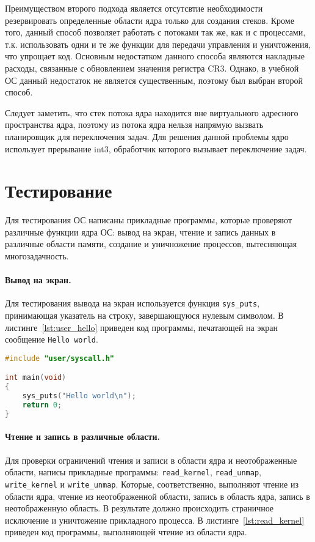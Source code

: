 Преимуществом второго подхода является отсутсвтие необходимости резервировать определенные
области ядра только для создания стеков. Кроме того, данный способ позволяет работать с потоками
так же, как и с процессами, т.к. использовать одни и те же функции для передачи управления и
уничтожения, что упрощает код. Основным недостатком данного способа являются накладные расходы,
связанные с обновлением значения регистра CR3. Однако, в учебной ОС данный недостаток не является
существенным, поэтому был выбран второй способ.

Следует заметить, что стек потока ядра находится вне виртуального адресного пространства ядра,
поэтому из потока ядра нельзя напрямую вызвать планировщик для переключения задач. Для решения данной
проблемы ядро использует прерывание int3, обработчик которого вызывает переключение задач.

\section{Тестирование}
Для тестирования ОС написаны прикладные программы, которые проверяют различные функции ядра ОС:
вывод на экран, чтение и запись данных в различные области памяти, создание и уничножение
процессов, вытесняющая многозадачность.

\paragraph{Вывод на экран.} Для тестирования вывода на экран используется функция \texttt{sys\_puts},
принимающая указатель на строку, завершающуюся нулевым символом. В листинге~\ref{lst:user_hello} приведен
код программы, печатающей на экран сообщение \texttt{Hello world}.

\begin{lstlisting}[language=C, caption={Использование функции \texttt{sys\_puts}}, label={lst:user_hello}]
#include "user/syscall.h"

int main(void)
{
	sys_puts("Hello world\n");
	return 0;
}
\end{lstlisting}

\paragraph{Чтение и запись в различные области.} Для проверки ограничений чтения и записи в
области ядра и неотображенные области, написы прикладные программы: \texttt{read\_kernel},
\texttt{read\_unmap}, \texttt{write\_kernel} и \texttt{write\_unmap}. Которые, соответственно,
выполняют чтение из области ядра, чтение из неотображенной области, запись в область ядра,
запись в неотображенную область. В результате должно происходить страничное исключение и
уничтожение прикладного процесса. В листинге~\ref{lst:read_kernel} приведен код программы,
выполняющей чтение из области ядра.

